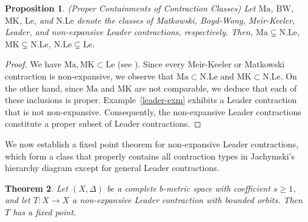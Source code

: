 \documentclass{birkjour}
\newtheorem{thm}{Theorem}[section]
\newtheorem{prop}[thm]{Proposition}
\theoremstyle{definition}
\theoremstyle{remark}
\numberwithin{equation}{section}
\begin{document}
\begin{prop}\label{proper}(Proper Containments of Contraction Classes)
Let $\mathrm{Ma}$, $\mathrm{BW}$, $\mathrm{MK}$, $\mathrm{Le}$, and $\mathrm{N.Le}$ denote the classes of Matkowski, Boyd-Wong, Meir-Keeler, Leader, and non-expansive Leader contractions, respectively. Then,    $\mathrm{Ma} \subsetneq \mathrm{N.Le}$,  $\mathrm{MK} \subsetneq \mathrm{N.Le}$,   $\mathrm{N.Le} \subsetneq \mathrm{Le}$.


\end{prop}
\begin{proof}
We have $\mathrm{Ma}, \mathrm{MK} \subset \mathrm{Le}$ (see \cite{jachymski2011equivalent}). Since every Meir-Keeler or Matkowski contraction is non-expansive, we observe that $\mathrm{Ma} \subset \mathrm{N.Le}$ and $\mathrm{MK} \subset \mathrm{N.Le}$. On the other hand, since $\mathrm{Ma}$ and $\mathrm{MK}$ are not comparable, we deduce that each of these inclusions is proper. Example~\ref{leader-exm} exhibits a Leader contraction that is not non-expansive. Consequently, the non-expansive Leader contractions constitute a proper subset of Leader contractions.
\end{proof}
We now establish a fixed point theorem for non-expansive Leader contractions, which form a class that properly contains all contraction types in Jachymski's hierarchy diagram \cite{jachymski2007nonlinear} except for general Leader contractions.
\begin{thm}\label{thm_leader}
Let $(X,\Delta)$ be a complete $b$-metric space with coefficient $s\geq 1$, and let $T:X\to X$ a non-expansive Leader contraction with bounded orbits. Then $T$ has a fixed point. 
\end{thm}
\end{document}
